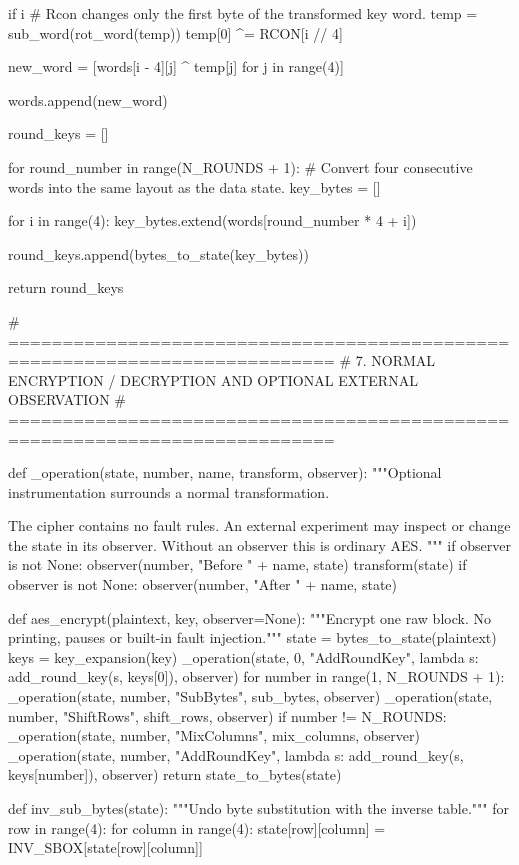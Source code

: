 \begin{lightcode}[numbers=left,firstnumber=1]
        if i %
            # Rcon changes only the first byte of the transformed key word.
            temp = sub_word(rot_word(temp))
            temp[0] ^= RCON[i // 4]

        new_word = [words[i - 4][j] ^ temp[j] for j in range(4)]

        words.append(new_word)

    round_keys = []

    for round_number in range(N_ROUNDS + 1):
        # Convert four consecutive words into the same layout as the data state.
        key_bytes = []

        for i in range(4):
            key_bytes.extend(words[round_number * 4 + i])

        round_keys.append(bytes_to_state(key_bytes))

    return round_keys


# ============================================================================
# 7. NORMAL ENCRYPTION / DECRYPTION AND OPTIONAL EXTERNAL OBSERVATION
# ============================================================================


def _operation(state, number, name, transform, observer):
    """Optional instrumentation surrounds a normal transformation.

    The cipher contains no fault rules. An external experiment may inspect or
    change the state in its observer. Without an observer this is ordinary AES.
    """
    if observer is not None:
        observer(number, "Before " + name, state)
    transform(state)
    if observer is not None:
        observer(number, "After " + name, state)


def aes_encrypt(plaintext, key, observer=None):
    """Encrypt one raw block. No printing, pauses or built-in fault injection."""
    state = bytes_to_state(plaintext)
    keys = key_expansion(key)
    _operation(state, 0, "AddRoundKey", lambda s: add_round_key(s, keys[0]), observer)
    for number in range(1, N_ROUNDS + 1):
        _operation(state, number, "SubBytes", sub_bytes, observer)
        _operation(state, number, "ShiftRows", shift_rows, observer)
        if number != N_ROUNDS:
            _operation(state, number, "MixColumns", mix_columns, observer)
        _operation(state, number, "AddRoundKey", lambda s: add_round_key(s, keys[number]), observer)
    return state_to_bytes(state)


def inv_sub_bytes(state):
    """Undo byte substitution with the inverse table."""
    for row in range(4):
        for column in range(4):
            state[row][column] = INV_SBOX[state[row][column]]



\end{lightcode}
